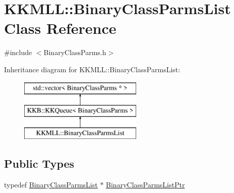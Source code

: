 \hypertarget{class_k_k_m_l_l_1_1_binary_class_parms_list}{}\section{K\+K\+M\+LL\+:\+:Binary\+Class\+Parms\+List Class Reference}
\label{class_k_k_m_l_l_1_1_binary_class_parms_list}


{\ttfamily \#include $<$Binary\+Class\+Parms.\+h$>$}

Inheritance diagram for K\+K\+M\+LL\+:\+:Binary\+Class\+Parms\+List\+:\begin{figure}[H]
\begin{center}
\leavevmode
\includegraphics[height=3.000000cm]{class_k_k_m_l_l_1_1_binary_class_parms_list}
\end{center}
\end{figure}
\subsection*{Public Types}
\begin{DoxyCompactItemize}
\item 
typedef \hyperlink{class_k_k_m_l_l_1_1_binary_class_parms_list}{Binary\+Class\+Parms\+List} $\ast$ \hyperlink{class_k_k_m_l_l_1_1_binary_class_parms_list_acdd9df4b1cfdbd470a7937a935b8eef6}{Binary\+Class\+Parms\+List\+Ptr}
\end{DoxyCompactItemize}
